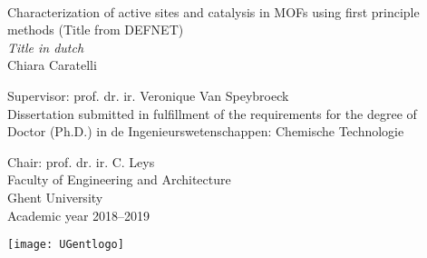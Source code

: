 \documentclass[10pt,twoside]{book}
\begin{document}


% 
 \thispagestyle{empty}   %
% 
\graphicspath{{figures/}}


\newpage\null\thispagestyle{empty}
\newpage\null\thispagestyle{empty}\newpage
\thispagestyle{empty}
% 


{\large \ \vspace{0.25\textheight} \\

\hspace{-\parindent}  Characterization of active sites and catalysis in MOFs using first principle methods (Title from DEFNET) \\

\hspace{-\parindent} \textit{Title in dutch} \\


\vspace{0.5cm}
\hspace{-\parindent}Chiara Caratelli}

\vspace*{\fill}
\hspace{-\parindent}Supervisor: prof. dr. ir.  Veronique Van Speybroeck \\
\hspace{-\parindent}Dissertation submitted in fulfillment of the requirements
 for the degree of\\
\hspace{-\parindent}Doctor (Ph.D.) in de Ingenieurswetenschappen: Chemische
Technologie
\\


\vspace{0.5cm}

 \hspace{-\parindent}\begin{minipage}{0.7\textwidth}
 \hspace{-\parindent}Chair: prof. dr. ir. C. Leys \\
  \hspace{-\parindent}Faculty of Engineering and Architecture\\
  \hspace{-\parindent}Ghent University\\
  \hspace{-\parindent}Academic year 2018--2019
\end{minipage}
\begin{minipage}{0.3\textwidth}
  \begin{flushright}
    \texttt{[image: UGentlogo]}
  \end{flushright}
\end{minipage}
\end{document}
